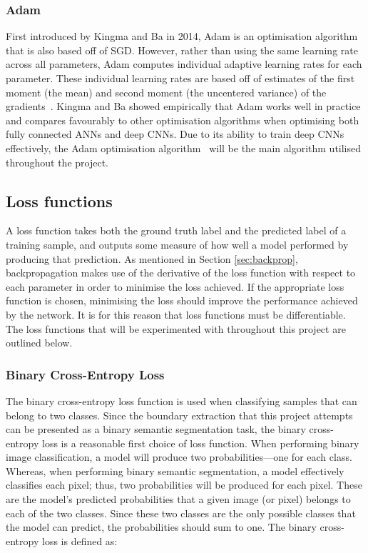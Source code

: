 \subsubsection{Adam}

First introduced by Kingma and Ba in 2014, Adam is an optimisation algorithm that is also based off of SGD. However, rather than using the same learning rate across all parameters, Adam computes individual adaptive learning rates for each parameter. These individual learning rates are based off of estimates of the first moment (the mean) and second moment (the uncentered variance) of the gradients~\cite{gdbad}. Kingma and Ba showed empirically that Adam works well in practice and compares favourably to other optimisation algorithms when optimising both fully connected ANNs and deep CNNs. Due to its ability to train deep CNNs effectively, the Adam optimisation algorithm~\cite{adam} will be the main algorithm utilised throughout the project.

\subsection{Loss functions}
\label{sec:loss}

A loss function takes both the ground truth label and the predicted label of a training sample, and outputs some measure of how well a model performed by producing that prediction. As mentioned in Section \ref{sec:backprop}, backpropagation makes use of the derivative of the loss function with respect to each parameter in order to minimise the loss achieved. If the appropriate loss function is chosen, minimising the loss should improve the performance achieved by the network. It is for this reason that loss functions must be differentiable. The loss functions that will be experimented with throughout this project are outlined below.

\subsubsection{Binary Cross-Entropy Loss}

The binary cross-entropy loss function is used when classifying samples that can belong to two classes. Since the boundary extraction that this project attempts can be presented as a binary semantic segmentation task, the binary cross-entropy loss is a reasonable first choice of loss function. When performing binary image classification, a model will produce two probabilities---one for each class. Whereas, when performing binary semantic segmentation, a model effectively classifies each pixel; thus, two probabilities will be produced for each pixel. These are the model's predicted probabilities that a given image (or pixel) belongs to each of the two classes. Since these two classes are the only possible classes that the model can predict, the probabilities should sum to one. The binary cross-entropy loss is defined as:


